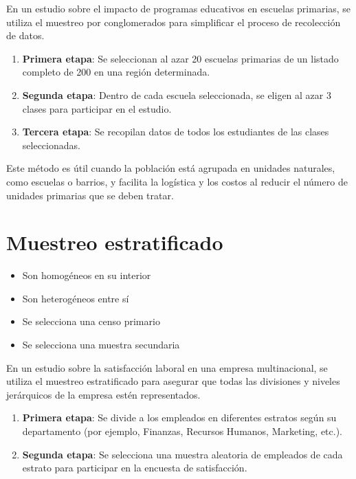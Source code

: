 \documentclass[
  letterpaper,
  DIV=11,
  numbers=noendperiod]{scrreprt}
\providecommand{\tightlist}{%
  \setlength{\itemsep}{0pt}\setlength{\parskip}{0pt}}\usepackage{longtable,booktabs,array}
\begin{document}
En un estudio sobre el impacto de programas educativos en escuelas
primarias, se utiliza el muestreo por conglomerados para simplificar el
proceso de recolección de datos.

\begin{enumerate}
\def\labelenumi{\arabic{enumi}.}
\tightlist
\item
  \textbf{Primera etapa}: Se seleccionan al azar 20 escuelas primarias
  de un listado completo de 200 en una región determinada.
\item
  \textbf{Segunda etapa}: Dentro de cada escuela seleccionada, se eligen
  al azar 3 clases para participar en el estudio.
\item
  \textbf{Tercera etapa}: Se recopilan datos de todos los estudiantes de
  las clases seleccionadas.
\end{enumerate}

Este método es útil cuando la población está agrupada en unidades
naturales, como escuelas o barrios, y facilita la logística y los costos
al reducir el número de unidades primarias que se deben tratar.

\section{Muestreo estratificado}\label{muestreo-estratificado}

\begin{itemize}
\tightlist
\item
  Son homogéneos en su interior
\item
  Son heterogéneos entre sí
\item
  Se selecciona una censo primario
\item
  Se selecciona una muestra secundaria
\end{itemize}

En un estudio sobre la satisfacción laboral en una empresa
multinacional, se utiliza el muestreo estratificado para asegurar que
todas las divisiones y niveles jerárquicos de la empresa estén
representados.

\begin{enumerate}
\def\labelenumi{\arabic{enumi}.}
\tightlist
\item
  \textbf{Primera etapa}: Se divide a los empleados en diferentes
  estratos según su departamento (por ejemplo, Finanzas, Recursos
  Humanos, Marketing, etc.).
\item
  \textbf{Segunda etapa}: Se selecciona una muestra aleatoria de
  empleados de cada estrato para participar en la encuesta de
  satisfacción.
\end{enumerate}
\end{document}
